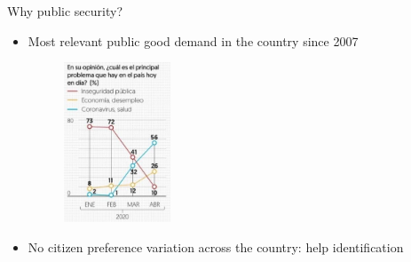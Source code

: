 \documentclass{beamer}
\begin{document}
\begin{frame}[label=why_security, noframenumbering]{Why public security?}

\begin{itemize}
	\item Most relevant public good demand in the country since 2007
	       \begin{figure}
\includegraphics[width=0.3\textwidth]{Figures_pres/leadingproblem_mexico2.png} 
       \captionsetup{justification=centering}
      \end{figure} 
      
	\item No citizen preference variation across the country: help identification
\end{itemize} 
	\hyperlink{this_paper}{}

\end{frame} 
\end{document}
